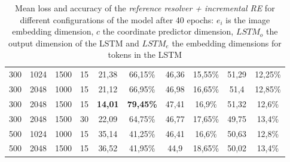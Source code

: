 \begin{table}[hb]
\begin{tabular}{cccc|cc|cc|cc}
        {300} & {1024} & {1500}   & {15}     & {21,38}                             & {66,15\%}                           & {46,36}                                  & {15,55\%}     & {51,29}       & {12,25\%}     \\
        {300} & {2048} & {1000}   & {15}     & {21,12}                             & {66,95\%}                           & {46,98}                                  & {16,65\%}     & {51,4}        & {12,85\%}     \\
        {300} & {2048} & {1500}   & {15}     & \textbf{14,01}                      & \textbf{79,45\%}                    & {47,41}                                  & {16,9\%}      & {51,32}       & {12,6\%}      \\
        {300} & {2048} & {1500}   & {30}     & {22,09}                             & {64,75\%}                           & {46,77}                                  & {17,65\%}     & {49,75}       & {13,4\%}      \\
        {500} & {1024} & {1000}   & {15}     & {35,14}                             & {41,25\%}                           & {46,41}                                  & {16,6\%}      & {50,63}       & {12,8\%}      \\
        {500} & {2048} & {1500}   & {15}     & {36,52}                             & {41,95\%}                           & {44,9}                                   & {18,65\%}     & {50,02}       & {13,4\%}      \\
        \bottomrule
    \end{tabular}
    \caption{Mean loss and accuracy of the \emph{reference resolver + incremental RE} for different configurations of the model after 40 epochs: $e_i$ is the image embedding dimension, $c$ the coordinate predictor dimension, $LSTM_o$ the output dimension of the LSTM and $LSTM_e$ the embedding dimensions for tokens in the LSTM}
    \label{tab:results:reference-resolver-gre}
\end{table}

